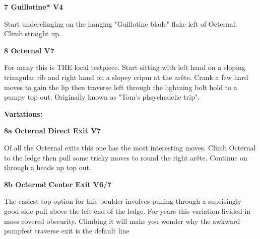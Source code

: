 \begin{multicols}{2}
\begin{adjustwidth}{0.5cm}{}
\end{adjustwidth}


\needspace{1.5cm}
\label{rt:Guillotine}
\colorbox{RoyalBlue!20}{
\parbox{0.95\linewidth}{
\textbf{
7 Guillotine* V4  
}}}

\begin{adjustwidth}{0.5cm}{}			
Start underclinging on the hanging "Guillotine blade" flake left of Octernal. Climb straight up.
\end{adjustwidth}



\needspace{1.5cm}
\label{rt:Octernal}
\colorbox{Goldenrod!50}{
\parbox{0.95\linewidth}{
\textbf{
8 Octernal V7  
}}}

\begin{adjustwidth}{0.5cm}{}			
For many this is THE local testpiece. Start sitting with left hand on a sloping triangular rib and right hand on a slopey cripm at the arête. Crank a few hard moves to gain the lip then traverse left through the lightning bolt hold to a pumpy top out. Originally known as "Tom's phsychadelic trip".
\end{adjustwidth}

\begin{adjustwidth}{0.5cm}{}				
\needspace{3cm}
\textbf{Variations:} \newline

\needspace{1.5cm}
\label{vr:Octernal Direct Exit}
\colorbox{Goldenrod!50}{
\parbox{0.95\linewidth}{
\textbf{
8a Octernal Direct Exit V7  
}}}

\begin{adjustwidth}{0.5cm}{}			
Of all the Octernal exits this one has the most interesting moves. Climb Octernal to the ledge then pull some tricky moves to round the right arête. Continue on through a heads up top out.
\end{adjustwidth}



\needspace{1.5cm}
\label{vr:Octernal Center Exit}
\colorbox{Goldenrod!50}{
\parbox{0.95\linewidth}{
\textbf{
8b Octernal Center Exit V6/7  
}}}

\begin{adjustwidth}{0.5cm}{}			
The easiest top option for this boulder involves pulling through a suprisingly good side pull above the left end of the ledge. For years this variation livided in moss covered obscurity. Climbing it will make you wonder why the awkward pumpfest traverse exit is the default line
\end{adjustwidth}




\end{adjustwidth}
\end{multicols}

